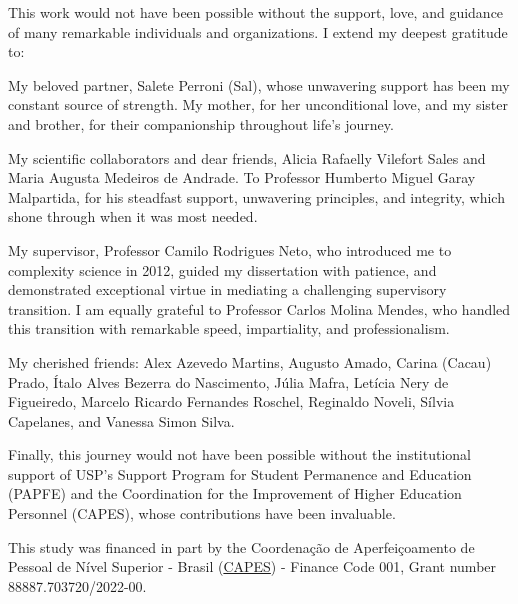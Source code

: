 

\begin{agradecimentos}[\agradecimentosname]

This work would not have been possible without the support, love, and
guidance of many remarkable individuals and organizations. I extend my
deepest gratitude to:

\smallskip

My beloved partner, Salete Perroni (Sal), whose unwavering support has
been my constant source of strength. My mother, for her unconditional
love, and my sister and brother, for their companionship throughout
life's journey.

My scientific collaborators and dear friends, Alicia Rafaelly Vilefort
Sales and Maria Augusta Medeiros de Andrade. To Professor Humberto
Miguel Garay Malpartida, for his steadfast support, unwavering
principles, and integrity, which shone through when it was most needed.

My supervisor, Professor Camilo Rodrigues Neto, who introduced me to
complexity science in 2012, guided my dissertation with patience, and
demonstrated exceptional virtue in mediating a challenging supervisory
transition. I am equally grateful to Professor Carlos Molina Mendes, who
handled this transition with remarkable speed, impartiality, and
professionalism.

My cherished friends: Alex Azevedo Martins, Augusto Amado, Carina
(Cacau) Prado, Ítalo Alves Bezerra do Nascimento, Júlia Mafra, Letícia
Nery de Figueiredo, Marcelo Ricardo Fernandes Roschel, Reginaldo Noveli,
Sílvia Capelanes, and Vanessa Simon Silva.

Finally, this journey would not have been possible without the
institutional support of USP's Support Program for Student Permanence
and Education (PAPFE) and the Coordination for the Improvement of Higher
Education Personnel (CAPES), whose contributions have been invaluable.

\smallskip
\begingroup
\renewcommand{\baselinestretch}{1}

\noindent This study was financed in part by the Coordenação de
Aperfeiçoamento de Pessoal de Nível Superior - Brasil
(\href{https://www.gov.br/capes/}{CAPES}) - Finance Code 001, Grant
number 88887.703720/2022-00.

\endgroup

\end{agradecimentos}


